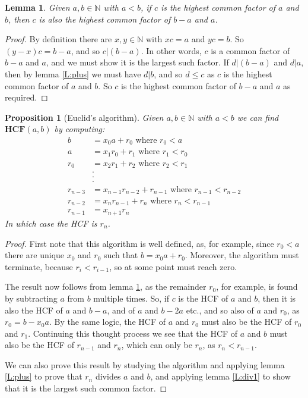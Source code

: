 \documentclass{article}
\theoremstyle{plain}
\newtheorem{proposition}[theorem]{Proposition}{\bfseries}{\itshape}
\newtheorem{lemma}[theorem]{Lemma}{\bfseries}{\upshape}
\newcommand{\bN}{\mathbb{N}}
\newcommand{\HCF}{\mathbf{HCF}}
\newcommand*{\prefix}{}
\begin{document}
\begin{lemma}\label{\prefix L:euclid}
Given $a,b\in\bN$ with $a<b$, if $c$ is the highest common factor of $a$ and $b$, then $c$ is also the highest common factor of $b-a$ and $a$.
\end{lemma}
\begin{proof}
By definition there are $x,y\in\bN$ with $xc = a$ and $yc= b$. So $(y-x)c = b - a$, and so $c|(b-a)$. In other words, $c$ is a common factor of $b-a$ and $a$, and we must show it is the largest such factor. If $d|(b-a)$ and $d|a$, then by lemma \ref{L:plus} we must have $d|b$, and so $d\leq c$ as $c$ is the highest common factor of $a$ and $b$. So $c$ is the highest common factor of $b-a$ and $a$ as required.
\end{proof}

\begin{proposition}[Euclid's algorithm]
Given $a,b\in\bN$ with $a< b$ we can find $\HCF(a,b)$ by computing:
\begin{align*}
b &= x_0 a + r_0 \text{ where $r_0< a$} \\
a &= x_1 r_0 + r_1 \text{ where $r_1< r_0$} \\
r_0&=x_2 r_1 + r_2 \text{ where $r_2< r_1$}\\
&.\\
&.\\
&.\\
r_{n-3} &= x_{n-1}r_{n-2} + r_{n-1}\text{ where $r_{n-1}< r_{n-2}$}\\
r_{n-2}&= x_{n} r_{n-1} + r_n \text{ where $r_n< r_{n-1}$} \\
r_{n-1}&= x_{n+1} r_n
\end{align*}
In which case the HCF is $r_n$.
\end{proposition}
\begin{proof}
First note that this algorithm is well defined, as, for example, since $r_0< a$ there are unique $x_0$ and $r_0$ such that $b = x_0 a + r_0$. Moreover, the algorithm must terminate, because $r_i < r_{i-1}$, so at some point must reach zero. 

The result now follows from lemma \ref{L:euclid}, as the remainder $r_0$, for example, is found by subtracting $a$ from $b$ multiple times. So, if $c$ is the HCF of $a$ and $b$, then it is also the HCF of $a$ and $b-a$, and of $a$ and $b-2a$ etc., and so also of $a$ and $r_0$, as $r_0 = b- x_0a$. By the same logic, the HCF of $a$ and $r_0$ must also be the HCF of $r_0$ and $r_1$. Continuing this thought process we see that the HCF of $a$ and $b$ must also be the HCF of $r_{n-1}$ and $r_n$, which can only be $r_n$, as $r_n<r_{n-1}$. 

We can also prove this result by studying the algorithm and applying lemma \ref{L:plus} to prove that $r_n$ divides $a$ and $b$, and applying lemma \ref{L:div1} to show that it is the largest such common factor. 
\end{proof}
\end{document}
